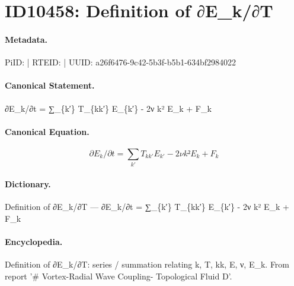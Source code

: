 \section*{ID10458: Definition of ∂E\_k/∂T}
\paragraph{Metadata.}
PiID:  | RTEID:  | UUID: a26f6476-9c42-5b3f-b5b1-634bf2984022

\paragraph{Canonical Statement.}
∂E\_k/∂t = ∑\_\{k′\} T\_\{kk′\} E\_\{k′\} - 2ν k² E\_k + F\_k

\paragraph{Canonical Equation.}
\[
∂E_k/∂t = ∑_{k′} T_{kk′} E_{k′} - 2ν k² E_k + F_k
\]

\paragraph{Dictionary.}
Definition of ∂E\_k/∂T — ∂E\_k/∂t = ∑\_\{k′\} T\_\{kk′\} E\_\{k′\} - 2ν k² E\_k + F\_k

\paragraph{Encyclopedia.}
Definition of ∂E\_k/∂T: series / summation relating k, T, kk, E, ν, E\_k. From report '\# Vortex-Radial Wave Coupling- Topological Fluid D'.
